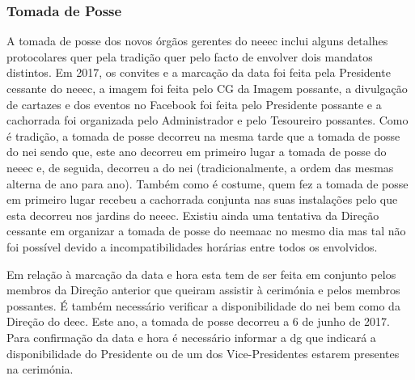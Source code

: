 
\subsubsection{Tomada de Posse}

A tomada de posse dos novos órgãos gerentes do \acrshort{neeec} inclui alguns detalhes protocolares quer pela tradição quer pelo facto de envolver dois mandatos distintos. Em 2017, os convites e a marcação da data foi feita pela Presidente cessante do \acrshort{neeec}, a imagem foi feita pelo CG da Imagem possante, a divulgação de cartazes e dos eventos no Facebook foi feita pelo Presidente possante e a cachorrada foi organizada pelo Administrador e pelo Tesoureiro possantes. Como é tradição, a tomada de posse decorreu na mesma tarde que a tomada de posse do \acrshort{nei} sendo que, este ano decorreu em primeiro lugar a tomada de posse do \acrshort{neeec} e, de seguida, decorreu a do \acrshort{nei} (tradicionalmente, a ordem das mesmas alterna de ano para ano). Também como é costume, quem fez a tomada de posse em primeiro lugar recebeu a cachorrada conjunta nas suas instalações pelo que esta decorreu nos jardins do \acrshort{neeec}. Existiu ainda uma tentativa da Direção cessante em organizar a tomada de posse do \acrshort{neemaac} no mesmo dia mas tal não foi possível devido a incompatibilidades horárias entre todos os envolvidos.

Em relação à marcação da data e hora esta tem de ser feita em conjunto pelos membros da Direção anterior que queiram assistir à cerimónia e pelos membros possantes. É também necessário verificar a disponibilidade do \acrshort{nei} bem como da Direção do \acrshort{deec}. Este ano, a tomada de posse decorreu a 6 de junho de 2017. Para confirmação da data e hora é necessário informar a \acrshort{dg} que indicará a disponibilidade do Presidente ou de um dos Vice-Presidentes estarem presentes na cerimónia.

